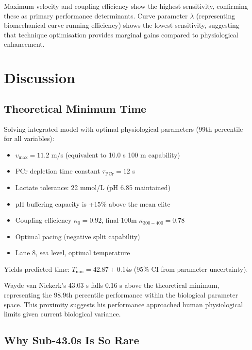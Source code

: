 \documentclass[12pt,a4paper]{article}
\begin{document}
Maximum velocity and coupling efficiency show the highest sensitivity, confirming these as primary performance determinants. Curve parameter $\lambda$ (representing biomechanical curve-running efficiency) shows the lowest sensitivity, suggesting that technique optimisation provides marginal gains compared to physiological enhancement.







\section{Discussion}

\subsection{Theoretical Minimum Time}

Solving integrated model with optimal physiological parameters (99th percentile for all variables):
\begin{itemize}
    \item $v_{\max} = 11.2$ m/s (equivalent to 10.0 s 100 m capability)
    \item PCr depletion time constant $\tau_{\text{PCr}} = 12$ s
    \item Lactate tolerance: 22 mmol/L (pH 6.85 maintained)
    \item pH buffering capacity is +15\% above the mean elite
    \item Coupling efficiency $\kappa_0 = 0.92$, final-100m $\kappa_{300-400} = 0.78$
    \item Optimal pacing (negative split capability)
    \item Lane 8, sea level, optimal temperature
\end{itemize}

Yields predicted time: $T_{\min} = 42.87 \pm 0.14$s (95\% CI from parameter uncertainty).

Wayde van Niekerk's 43.03 s falls 0.16 s above the theoretical minimum, representing the 98.9th percentile performance within the biological parameter space. This proximity suggests his performance approached human physiological limits given current biological variance.

\subsection{Why Sub-43.0s Is So Rare}
\end{document}
